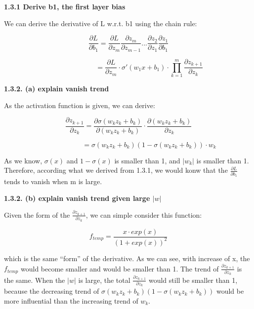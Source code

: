 \documentclass{article} %
\newcommand{\abs}[1]{\left\lvert #1 \right\rvert}
\begin{document}
\textbf{1.3.1 Derive b1, the first layer bias}

We can derive the derivative of L w.r.t. b1 using the chain rule:

\begin{equation}
\frac{\partial L}{\partial b_1} =
\frac{\partial L}{\partial z_m} \frac{\partial z_m}{\partial z_{m-1}} ...
\frac{\partial z_{2}}{\partial z_{1}} \frac{\partial z_{1}}{\partial b_1}
\end{equation}

\begin{equation}
\qquad \qquad \qquad
= \frac{\partial L}{\partial z_m}
\cdot \sigma' (w_1 x + b_1)
\cdot \prod_{k=1}^m \frac{\partial z_{k+1}}{\partial z_k}
\end{equation}

\textbf{1.3.2. (a) explain vanish trend}

As the activation function is given, we can derive:

\begin{equation}
\frac{\partial z_{k+1}}{\partial z_k} =
\frac{\partial \sigma (w_k z_k + b_k)}{\partial (w_k z_k + b_k)}
\cdot \frac{\partial (w_k z_k + b_k)}{\partial z_k}
\end{equation}

\begin{equation}
\qquad \qquad \qquad =
\sigma (w_k z_k + b_k) (1- \sigma (w_k z_k + b_k))
\cdot w_k
\end{equation}

As we know, $\sigma (x)$ and $1-\sigma (x)$ is smaller than 1, and $\abs{w_k}$
is smaller than 1. Therefore, according what we derived from 1.3.1, we would
konw that the $\frac{\partial L}{\partial b_1}$ tends to vanish when m is large.

\textbf{1.3.2. (b) explain vanish trend given large $\abs{w}$}

Given the form of the $\frac{\partial z_{k+1}}{\partial z_k}$, we can simple
consider this function:

\begin{equation}
f_{temp} = \frac{x \cdot exp(x)}{ (1+exp(x))^2}
\end{equation}

which is the same ``form'' of the derivative. As we can see, with increase of x,
the $f_{temp}$ would become smaller and would be smaller than 1. The trend of
$\frac{\partial z_{k+1}}{\partial z_k}$ is the same. When the $\abs{w}$ is
large, the total $\frac{\partial z_{k+1}}{\partial z_k}$ would still be smaller
than 1, because the decreasing trend of
$\sigma (w_k z_k + b_k) (1- \sigma (w_k z_k + b_k))$ would be more influential
than the increasing trend of $w_k$.
\end{document}

